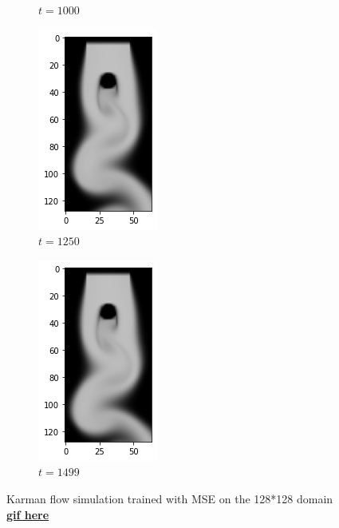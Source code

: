 \documentclass[a4paper,12pt,twoside]{report}
\begin{document}
\begin{figure}
\begin{subfigure}{0.18\textwidth}
		\caption{$t=1000$}
	\end{subfigure}
	\begin{subfigure}{0.18\textwidth}
		\centering
		\includegraphics[scale=0.5]{karmanflow/mse_density_001250.png}
		\caption{$t=1250$}
	\end{subfigure}
	\begin{subfigure}{0.18\textwidth}
		\centering
		\includegraphics[scale=0.5]{karmanflow/mse_density_001499.png}
		\caption{$t=1499$}
	\end{subfigure}
	\caption{Karman flow simulation trained with MSE on the 128*128 domain \href{https://github.com/w191444052/sol-data/blob/master/karman_high/mse.gif}{\bf{gif here}}}
	\label{sol karman high mse}
\end{figure}
\end{document}
